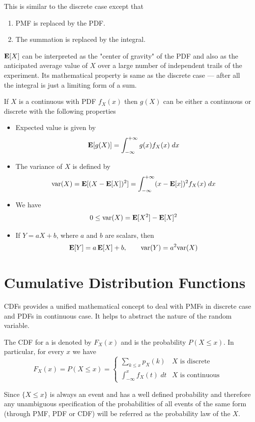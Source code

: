  This is similar to the discrete case except that 
 \begin{enumerate}
    \item PMF is replaced by the PDF.
    \item The summation is replaced by the integral.
 \end{enumerate}

 $\operatorname{\textbf{E}}[X]$ can be interpreted as the "center of gravity" of the PDF and also as the anticipated average value of $X$ over a large number of independent trails of the experiment. Its mathematical property is same as the discrete case --- after all the integral is just a limiting form of a sum.

 If $X$ is a continuous \rv with PDF $f_X(x)$ then $g(X)$ can be either a continuous or discrete \rv with the following properties
 \begin{itemize}
     \item Expected value is given by
     \[\operatorname{\textbf{E}}[g(X)]=\int_{-\infty}^{+\infty}g(x)f_X(x) \; dx\]
     \item The variance of $X$ is defined by
     \[\text{var}(X)=\operatorname{\textbf{E}}[(X-\operatorname{\textbf{E}}[X])^2]=\int_{-\infty}^{+\infty}(x-\operatorname{\textbf{E}}[x])^2 f_X(x) \; dx\]
     \item We have
     \[0 \le \text{var}(X)=\operatorname{\textbf{E}}[X^2]-\operatorname{\textbf{E}}[X]^2\]
     \item If $Y=aX+b$, where $a$ and $b$ are scalars, then
     \[\operatorname{\textbf{E}}[Y]=a\operatorname{\textbf{E}}[X]+b, \qquad \text{var}(Y)=a^2\text{var}(X)\]
 \end{itemize}

 \section{Cumulative Distribution Functions}
 CDFs provides a unified mathematical concept to deal with PMFs in discrete case and PDFs in continuous case. It helps to abstract the nature of the random variable.

 The CDF for a \rv is denoted by $F_X(x)$ and is the probability $P(X \le x)$. In particular, for every $x$ we have
 \[\boxed{
     F_X(x)=P(X \le x) = \begin{cases}
         \sum_{k \le x}p_X(k) & X \text{ is discrete} \\
         \int_{-\infty}^{x}f_X(t) \; dt & X \text{ is continuous}
     \end{cases}
 }\]
 
 Since $\{X\le x \}$ is always an event and has a well defined probability and therefore any unambiguous specification of the probabilities of all events of the same form (through PMF, PDF or CDF) will be referred as the probability law of the \rv $X$.

